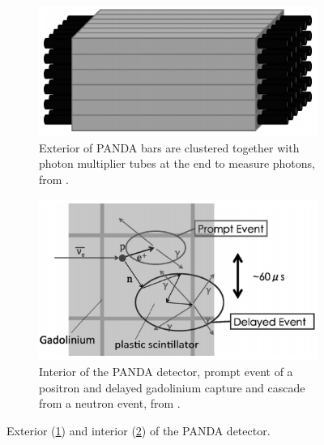 \begin{figure}[htbp]
\centering
\begin{subfigure}{.5\textwidth}
  \centering
  \includegraphics[width=\linewidth]{Chapter2/Figs/Raster/Panda_far.png}
  \captionsetup{width=.9\linewidth}
  \caption{Exterior of PANDA bars are clustered together with photon multiplier tubes at the end to measure photons, from \cite{PANDA_2014}.}
  \label{subFig:pandaFar}
\end{subfigure}%
\begin{subfigure}{.5\textwidth}
  \centering
\includegraphics[width=\linewidth]{Chapter2/Figs/Raster/Panda_close.png}
  \captionsetup{width=.9\linewidth}
  \caption{Interior of the PANDA detector, prompt event of a positron and delayed gadolinium capture and cascade from a neutron event, from \cite{PANDA_2014}.}
  \label{subFig:pandaClose}
\end{subfigure}
\caption{Exterior (\ref{subFig:pandaFar}) and interior (\ref{subFig:pandaClose}) of the PANDA detector.}
\label{fig:pandaCloseFar}
\end{figure}

